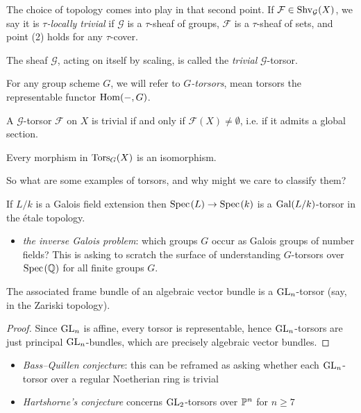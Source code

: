 \documentclass[11pt,openany]{book}
\begin{document}
\begin{terminology} The choice of topology comes into play in that second point. If $\mathcal{F} \in \Shv_{\mathcal{G}}(X)$, we say it is $\tau$\textit{-locally trivial} if $\mathcal{G}$ is a $\tau$-sheaf of groups, $\mathcal{F}$ is a $\tau$-sheaf of sets, and point (2) holds for any $\tau$-cover.
\end{terminology}


\begin{example} The sheaf $\mathcal{G}$, acting on itself by scaling, is called the \textit{trivial} $\mathcal{G}$-torsor.
\end{example}

\begin{example} For any group scheme $G$, we will refer to $G$\textit{-torsors}, mean torsors the representable functor $\Hom(-,G)$.
\end{example}

\begin{proposition}\label{prop:torsor-trivial-iff-global-section} 
A $\mathcal{G}$-torsor $\mathcal{F}$ on $X$ is trivial if and only if $\mathcal{F}(X) \ne \emptyset$, i.e. if it admits a global section.
\end{proposition}



\begin{theorem} Every morphism in $\Tors_G(X)$ is an isomorphism.
\end{theorem}

So what are some examples of torsors, and why might we care to classify them?

\begin{example}\label{exa:galois-field-extn-torsor} 
If $L/k$ is a Galois field extension then $\Spec(L) \to \Spec(k)$ is a $\Gal(L/k)$-torsor in the \'etale topology.
\end{example}
\begin{itemize}
\item \textit{the inverse Galois problem}: which groups $G$ occur as Galois groups of number fields? This is asking to scratch the surface of understanding $G$-torsors over $\Spec(\Q)$ for all finite groups $G$.
\end{itemize}

\begin{example}
The associated frame bundle of an algebraic vector bundle is a $\GL_n$-torsor (say, in the Zariski topology).
\end{example}
\begin{proof} Since $\GL_n$ is affine, every torsor is representable, hence $\GL_n$-torsors are just principal $\GL_n$-bundles, which are precisely algebraic vector bundles.
\end{proof}
\begin{itemize}
    \item \textit{Bass--Quillen conjecture}: this can be reframed as asking whether each $\GL_n$-torsor over a regular Noetherian ring is trivial
    \item \textit{Hartshorne's conjecture} concerns $\GL_2$-torsors over $\P^n$ for $n\ge7$
\end{itemize}
\end{document}
